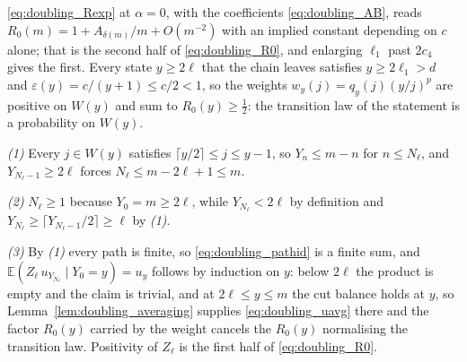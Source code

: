 \eqref{eq:doubling_Rexp} at $\alpha=0$, with the coefficients \eqref{eq:doubling_AB}, reads
$R_0(m)=1+A_{\delta(m)}/m+O(m^{-2})$ with an implied constant depending on $c$ alone; that is
the second half of \eqref{eq:doubling_R0}, and enlarging $\ell_1$ past $2c_4$ gives the first.
Every state $y\geq2\ell$ that the chain leaves satisfies $y\geq2\ell_1>d$ and
$\varepsilon(y)=c/(y+1)\leq c/2<1$, so the weights $w_y(j)=q_y(j)(y/j)^{p}$ are positive on
$W(y)$ and sum to $R_0(y)\geq\tfrac12$: the transition law of the statement is a probability
on $W(y)$.

\emph{(1)} Every $j\in W(y)$ satisfies $\lceil y/2\rceil\leq j\leq y-1$, so $Y_n\leq m-n$ for
$n\leq N_\ell$, and $Y_{N_\ell-1}\geq2\ell$ forces $N_\ell\leq m-2\ell+1\leq m$.

\emph{(2)} $N_\ell\geq1$ because $Y_0=m\geq2\ell$, while $Y_{N_\ell}<2\ell$ by definition and
$Y_{N_\ell}\geq\lceil Y_{N_\ell-1}/2\rceil\geq\ell$ by \emph{(1)}.

\emph{(3)} By \emph{(1)} every path is finite, so \eqref{eq:doubling_pathid} is a finite sum,
and $\mathbb E(Z_\ell\,u_{Y_{N_\ell}}\mid Y_0=y)=u_y$ follows by induction on $y$: below
$2\ell$ the product is empty and the claim is trivial, and at $2\ell\leq y\leq m$ the cut
balance holds at $y$, so Lemma~\ref{lem:doubling_averaging} supplies \eqref{eq:doubling_uavg}
there and the factor $R_0(y)$ carried by the weight cancels the $R_0(y)$ normalising the
transition law. Positivity of $Z_\ell$ is the first half of \eqref{eq:doubling_R0}.
